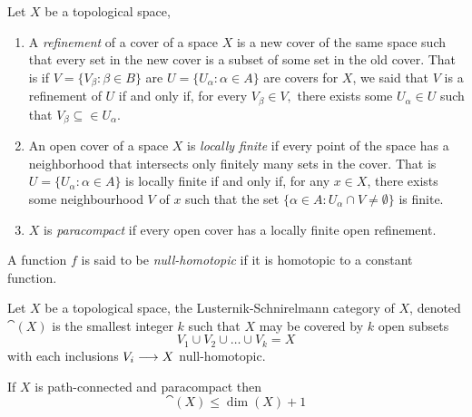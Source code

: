 \begin{defn}
    Let $X$ be a topological space,
    \begin{enumerate}
        \item A \textit{refinement} of a cover of a space $X$ is a new cover of the same space such that every set in the new cover is a subset of some set in the old cover. That is if $V = \{V_\beta : \beta \in B\}$ are $U = \{U_\alpha : \alpha \in A\}$ are covers for $X$, we said that $V$ is a refinement of $U$ if and only if, for every $V_\beta \in V,$ there exists some $U_\alpha \in U$ such that $V_\beta \subseteq \in U_\alpha$.
        \item An open cover of a space $X$ is \textit{locally finite} if every point of the space has a neighborhood that intersects only finitely many sets in the cover. That is $U = \{U_\alpha : \alpha \in A\}$ is locally finite if and only if, for any $x \in X$, there exists some neighbourhood $V$ of $x$ such that the set $\{\alpha \in A : U_\alpha \cap V \neq \emptyset\}$ is finite.
        \item $X$ is \textit{paracompact} if every open cover has a locally finite open refinement. 
    \end{enumerate}
\end{defn}

\begin{defn}
    A function $f$ is said to be \textit{null-homotopic} if it is homotopic to a constant function.
\end{defn}

\begin{defn}
    Let $X$ be a topological space, the Lusternik-Schnirelmann category of $X$, denoted $\cat(X)$ is the smallest integer $k$ such that $X$ may be covered by $k$ open subsets 
    \[
        V_1 \cup V_2 \cup \ldots \cup V_k = X
    \] 
    with each inclusions $V_i \longrightarrow X$ null-homotopic.
\end{defn}

\begin{prop}\cite{james1978category}\label{james:1}
    If $X$ is path-connected and paracompact then
    \[
        \cat(X) \le \dim(X) + 1  
    \]
\end{prop}

